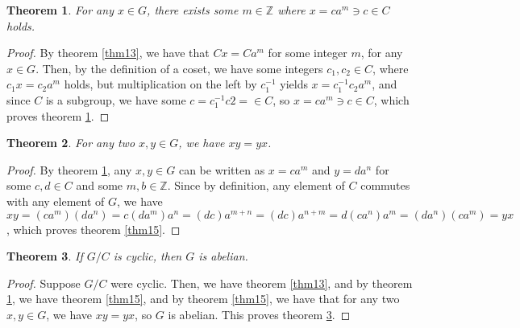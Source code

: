 \documentclass[12pt]{article}
\newcommand{\ints}{\mathbb{Z}}
\newtheorem{thm}{Theorem}
\begin{document}
\begin{thm} \label{thm14}
	For any $x \in G$, there exists some $m \in \ints$ where $x = ca^m \ni c \in C$ holds.
\end{thm}

\begin{proof}
	By theorem \ref{thm13},
	we have that $Cx = Ca^m$
	for some integer $m$,
	for any $x \in G$.
	Then, by the definition of a coset,
	we have some integers $c_1,c_2 \in C$,
	where $c_1x = c_2a^m$ holds,
	but multiplication on the left by $c_1^{-1}$
	yields $x = c_1^{-1}c_2a^m$,
	and since $C$ is a subgroup,
	we have some $c = c_1^{-1}c2 = \in C$,
	so $x = ca^m \ni c \in C$,
	which proves theorem \ref{thm14}.
\end{proof}

\begin{thm}
	For any two $x,y \in G$, we have $xy = yx$.
\end{thm}

\begin{proof} \label{thm15}
	By theorem \ref{thm14},
	any $x,y \in G$ can be written as
	$x = ca^m$ and $y = da^n$
	for some $c,d \in C$
	and some $m,b \in \ints$.
	Since by definition,
	any element of $C$ commutes
	with any element of $G$,
	we have $xy = (ca^m)(da^n) = c(da^m)a^n = (dc)a^{m + n}
	= (dc)a^{n + m} = d(ca^n)a^m = (da^n)(ca^m) = yx$,
	which proves theorem \ref{thm15}.
\end{proof}

\begin{thm} \label{thm16}
	If $G/C$ is cyclic, then $G$ is abelian.
\end{thm}

\begin{proof}
	Suppose $G/C$ were cyclic.
	Then, we have theorem \ref{thm13},
	and by theorem \ref{thm14},
	we have theorem \ref{thm15},
	and by theorem \ref{thm15},
	we have that for any two
	$x,y \in G$, we have $xy = yx$,
	so $G$ is abelian.
	This proves theorem \ref{thm16}.
\end{proof}
\end{document}
